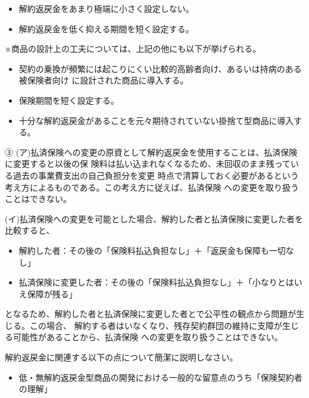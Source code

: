 \documentclass[report,gutter=10mm,fore-edge=10mm,uplatex,dvipdfmx]{jlreq}
\begin{document}
\begin{itemize}
 \item 解約返戻金をあまり極端に小さく設定しない。
 \item 解約返戻金を低く抑える期間を短く設定する。
\end{itemize}

※商品の設計上の工夫については、上記の他にも以下が挙げられる。
\begin{itemize}
 \item 契約の乗換が頻繁には起こりにくい比較的高齢者向け、あるいは持病のある被保険者向け
に設計された商品に導入する。
 \item 保険期間を短く設定する。
 \item 十分な解約返戻金があることを元々期待されていない掛捨て型商品に導入する。
\end{itemize}

③
(ア)払済保険への変更の原資として解約返戻金を使用することは、払済保険に変更すると以後の保
険料は払い込まれなくなるため、未回収のまま残っている過去の事業費支出の自己負担分を変更
時点で清算しておく必要があるという考え方によるものである。この考え方に従えば、払済保険
への変更を取り扱うことはできない。

(イ)払済保険への変更を可能とした場合、解約した者と払済保険に変更した者を比較すると、
\begin{itemize}
 \item 解約した者：その後の「保険料払込負担なし」＋「返戻金も保障も一切なし」
 \item 払済保険に変更した者：その後の「保険料払込負担なし」＋「小なりとはいえ保障が残る」
\end{itemize}
となるため、解約した者と払済保険に変更した者とで公平性の観点から問題が生じる。この場合、
解約する者はいなくなり、残存契約群団の維持に支障が生じる可能性があることから、払済保険
への変更を取り扱うことはできない。

解約返戻金に関連する以下の点について簡潔に説明しなさい。
\begin{itemize}
\item 低・無解約返戻金型商品の開発における一般的な留意点のうち「保険契約者の理解」
\end{itemize}
\end{document}
